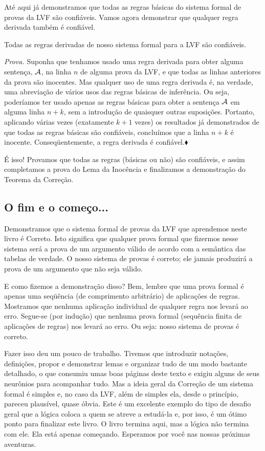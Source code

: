 Até aqui já demonstramos que todas as regras básicas do sistema formal de provas da LVF são confiáveis.
Vamos agora demonstrar que qualquer regra derivada também é confiável.

\begin{factoidboxe}
	Todas as regras derivadas de nosso sistema formal para a LVF são confiáveis.
\end{factoidboxe}
\noindent\emph{Prova.}
	Suponha que tenhamos usado uma regra derivada para obter alguma sentença, $\mathcal{A}$, na linha $n$ de alguma prova da LVF, e que todas as linhas anteriores da prova são inocentes.
	Mas qualquer uso de uma regra derivada é, na verdade, uma abreviação de vários usos das regras básicas de inferência.
	Ou seja, poderíamos ter usado apenas as regras básicas para obter a sentença $\mathcal{A}$ em alguma linha $n+k$, sem a introdução de quaisquer outras suposições.
	Portanto, aplicando várias vezes (exatamente $k+1$ vezes) os resultados já demonstrados de que todas as regras básicas são confiáveis, concluímos que a linha $n+k$ é inocente. Conseqüentemente, a regra derivada é confiável.$\blacklozenge$

É isso! Provamos que todas as regras (básicas ou não) são confiáveis, e assim completamos a prova do Lema da Inocência e finalizamos a demonstração do Teorema da Correção.


\subsection{O fim e o começo...}
Demonstramos que o sistema formal de provas da LVF que aprendemos neste livro é Correto. Isto significa que qualquer prova formal que fizermos nesse sistema será a prova de um argumento válido de acordo com a semântica das tabelas de verdade.
O nosso sistema de provas é correto; ele jamais produzirá a prova de um argumento que não seja válido.

E como fizemos a demonstração disso? Bem, lembre que uma prova formal é apenas uma seqüência (de comprimento arbitrário) de aplicações de regras.
Mostramos que nenhuma aplicação individual de qualquer regra nos levará ao erro. Segue-se (por indução) que nenhuma prova formal (sequência finita de aplicações de regras) nos levará ao erro. Ou seja: nosso sistema de provas é correto.

Fazer isso deu um pouco de trabalho.
Tivemos que introduzir notações, definições, propor e demonstrar lemas e organizar tudo de um modo bastante detalhado, o que consumiu umas boas páginas deste texto e exigiu alguns de seus neurônios para acompanhar tudo.
Mas a ideia geral da Correção de um sistema formal é simples e, no caso da LVF, além de simples ela, desde o princípio, pareceu plausível, quase óbvia.
Este é um excelente exemplo do tipo de desafio geral que a lógica coloca a quem se atreve a estudá-la e, por isso, é um ótimo ponto para finalizar este livro.
O livro termina aqui, mas a lógica não termina com ele. Ela está apenas começando. Esperamos por você nas nossas próximas aventuras. 



